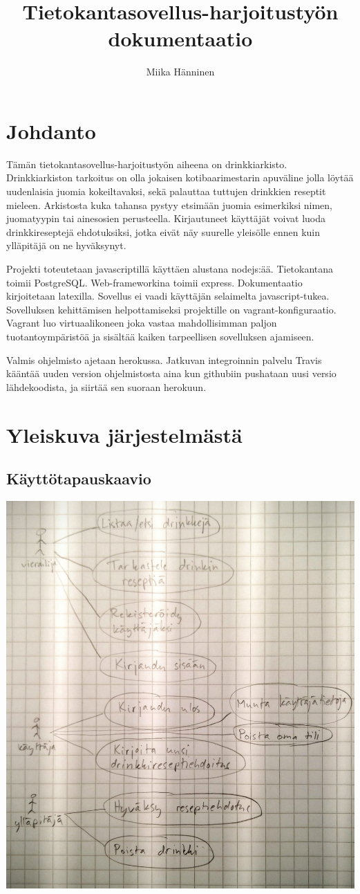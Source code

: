 \documentclass[a4paper]{article}
\title{Tietokantasovellus-harjoitustyön dokumentaatio}
\author{Miika Hänninen}
\begin{document}
\maketitle
\tableofcontents
\section{Johdanto}
Tämän tietokantasovellus-harjoitustyön aiheena on drinkkiarkisto. Drinkkiarkiston tarkoitus on olla jokaisen kotibaarimestarin apuväline jolla löytää uudenlaisia juomia kokeiltavaksi, sekä palauttaa tuttujen drinkkien reseptit mieleen. Arkistosta kuka tahansa pystyy etsimään juomia esimerkiksi nimen, juomatyypin tai ainesosien perusteella. Kirjautuneet käyttäjät voivat luoda drinkkireseptejä ehdotuksiksi, jotka eivät näy suurelle yleisölle ennen kuin ylläpitäjä on ne hyväksynyt.

Projekti toteutetaan javascriptillä käyttäen alustana nodejs:ää. Tietokantana toimii PostgreSQL. Web-frameworkina toimii express. Dokumentaatio kirjoitetaan latexilla. Sovellus ei vaadi käyttäjän selaimelta javascript-tukea. Sovelluksen kehittämisen helpottamiseksi projektille on vagrant-konfiguraatio. Vagrant luo virtuaalikoneen joka vastaa mahdollisimman paljon tuotantoympäristöä ja sisältää kaiken tarpeellisen sovelluksen ajamiseen. 

Valmis ohjelmisto ajetaan herokussa. Jatkuvan integroinnin palvelu Travis kääntää uuden version ohjelmistosta aina kun githubiin pushataan uusi versio lähdekoodista, ja siirtää sen suoraan herokuun.
\pagebreak
\section{Yleiskuva järjestelmästä}
\subsection{Käyttötapauskaavio}
\includegraphics[width=\textwidth]{doc/usecase-diagram}
\end{document}
